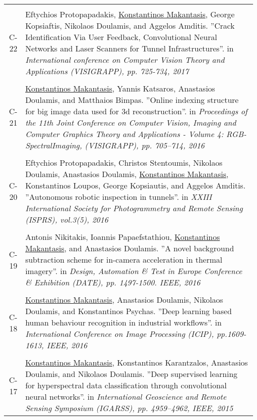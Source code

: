 \documentclass[a4paper,10pt]{article}
\begin{document}
\begin{longtable}{r p{11cm}}
 \multicolumn{2}{c}{} \\
C-22 &\small{Eftychios Protopapadakis, \underline{Konstantinos Makantasis}, George Kopsiaftis, Nikolaos Doulamis, and Aggelos Amditis. ''Crack Identification Via User Feedback, Convolutional Neural Networks and Laser Scanners for Tunnel Infrastructures''. in \textit{International conference on Computer Vision Theory and Applications (VISIGRAPP), pp. 725-734, 2017}}\\
 \multicolumn{2}{c}{} \\
C-21 &\small{\underline{Konstantinos Makantasis}, Yannis Katsaros, Anastasios Doulamis, and Matthaios Bimpas. ''Online indexing structure for big image data used for 3d reconstruction''. in \textit{Proceedings of the 11th Joint Conference on Computer Vision, Imaging and Computer Graphics Theory and Applications - Volume 4: RGB-SpectralImaging, (VISIGRAPP), pp. 705–714, 2016}}\\
 \multicolumn{2}{c}{} \\
C-20 &\small{Eftychios Protopapadakis, Christos Stentoumis, Nikolaos Doulamis, Anastasios Doulamis, \underline{Konstantinos Makantasis}, Konstantinos Loupos, George Kopsiautis, and Aggelos Amditis. ''Autonomous robotic inspection in tunnels''. in \textit{XXIII International Society for Photogrammetry and Remote Sensing (ISPRS), vol.3(5), 2016}}\\
 \multicolumn{2}{c}{} \\
C-19 &\small{Antonis Nikitakis, Ioannis Papaefstathiou, \underline{Konstantinos Makantasis}, and Anastasios Doulamis. ''A novel background subtraction scheme for in-camera acceleration in thermal imagery''. in \textit{Design, Automation \& Test in Europe Conference \& Exhibition (DATE), pp. 1497-1500. IEEE, 2016}}\\
 \multicolumn{2}{c}{} \\
C-18 &\small{\underline{Konstantinos Makantasis}, Anastasios Doulamis, Nikolaos Doulamis, and Konstantinos Psychas. ''Deep learning based human behaviour recognition in industrial workflows''. in \textit{International Conference on Image Processing (ICIP), pp.1609-1613, IEEE,  2016}}\\
 \multicolumn{2}{c}{} \\
C-17 &\small{\underline{Konstantinos Makantasis}, Konstantinos Karantzalos, Anastasios Doulamis, and Nikolaos Doulamis. ''Deep supervised learning for hyperspectral data classification through convolutional neural networks''. in \textit{International Geoscience and Remote Sensing Symposium (IGARSS), pp. 4959–4962, IEEE, 2015}}\\

\end{longtable}
\end{document}
